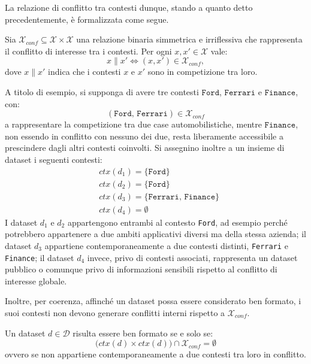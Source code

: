 La relazione di conflitto tra contesti dunque, stando a quanto detto precedentemente, è formalizzata come segue.

\begin{definition}
    \label{def:conflitto_contesti}
    Sia $\mathcal{X}_{conf} \subseteq \mathcal{X} \times \mathcal{X}$ una relazione binaria simmetrica e irriflessiva che rappresenta il conflitto di interesse tra i contesti. Per ogni $x, x' \in \mathcal{X}$ vale:
    \begin{equation}
        x \parallel x'
        \iff
        (x, x') \in \mathcal{X}_{conf},
    \end{equation}
    dove $x \parallel x'$ indica che i contesti $x$ e $x'$ sono in competizione tra loro.
\end{definition}

A titolo di esempio, si supponga di avere tre contesti $\mathtt{Ford}$, $\mathtt{Ferrari}$ e $\mathtt{Finance}$, con:
\begin{equation}
    (\mathtt{Ford},\, \mathtt{Ferrari}) \in \mathcal{X}_{conf}
\end{equation}
a rappresentare la competizione tra due case automobilistiche, mentre $\mathtt{Finance}$, non essendo in conflitto con nessuno dei due, resta liberamente accessibile a prescindere dagli altri contesti coinvolti. Si assegnino inoltre a un insieme di dataset i seguenti contesti:
\begin{align}
    &ctx(d_1) = \{\mathtt{Ford}\} \\[1ex]
    &ctx(d_2) = \{\mathtt{Ford}\} \\[1ex]
    &ctx(d_3) = \{\mathtt{Ferrari},\, \mathtt{Finance}\} \\[1ex]
    &ctx(d_4) = \emptyset 
\end{align}
I dataset $d_1$ e $d_2$ appartengono entrambi al contesto \texttt{Ford}, ad esempio perché potrebbero appartenere a due ambiti applicativi diversi ma della stessa azienda; il dataset $d_3$ appartiene contemporaneamente a due contesti distinti, \texttt{Ferrari} e \texttt{Finance}; il dataset $d_4$ invece, privo di contesti associati, rappresenta un dataset pubblico o comunque privo di informazioni sensibili rispetto al conflitto di interesse globale.

Inoltre, per coerenza, affinché un dataset possa essere considerato ben formato, i suoi contesti non devono generare conflitti interni rispetto a $\mathcal{X}_{conf}$.

\begin{definition}
    \label{def:buona_formazione_ctx}
    Un dataset $d \in \mathcal{D}$ risulta essere ben formato se e solo se:
    \begin{equation}
        \bigl( ctx(d) \times ctx(d) \bigr) \cap \mathcal{X}_{conf} = \emptyset
    \end{equation}
    ovvero se non appartiene contemporaneamente a due contesti tra loro in conflitto.
\end{definition}

